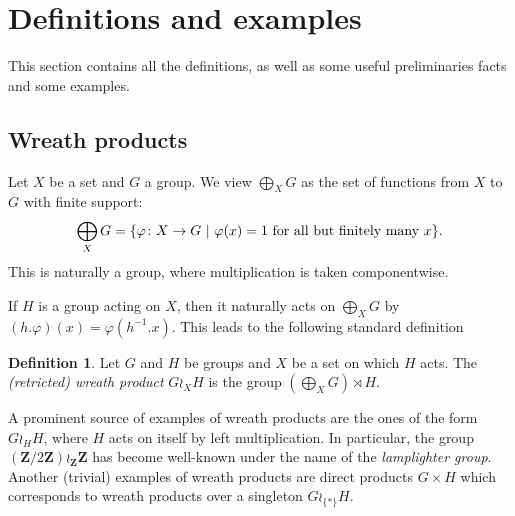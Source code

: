 \documentclass[a4paper]{article}
\newtheorem{cor}[lem]{Corollary}
\theoremstyle{definition}
\newtheorem{defn}[lem]{Definition}
\theoremstyle{remark}%
\newcommand*{\field}[1]{\mathbf{#1}}
\newcommand*{\Z}{\field{Z}}
\newcommand{\setst}[2]{\{#1\ |\ #2\}}
\begin{document}
%
%
%
%
%
%
%
%
%
%
\section{Definitions and examples}
This section contains all the definitions, as well as some useful preliminaries facts and some examples.
%
%
%
%
%
%
%
%
%
%
\subsection{Wreath products}
%
%
%
%
%
Let $X$ be a set and $G$ a group. We view
$\bigoplus_XG$ as the set of functions from $X$ to $G$ with finite support:
\[
	\bigoplus_XG=\setst{\varphi\colon X\to G}{\varphi(x)=1 \textnormal{ for all but finitely many }x}.
\]
This is naturally a group, where multiplication is taken componentwise.

If $H$ is a group acting on $X$, then it naturally acts on $\bigoplus_XG$
by $(h.\varphi)(x)=\varphi(h^{-1}.x)$.
This leads to the following standard definition
\begin{defn}\label{Def:WreathProd}
Let $G$ and $H$ be groups and $X$ be a set on which $H$ acts.
The \emph{(retricted) wreath product} $G\wr_XH$ is the group $(\bigoplus_XG)\rtimes H$.
\end{defn}
A prominent  source of examples of wreath products are the ones of the form $G\wr_HH$, where $H$ acts on itself by left multiplication.
In particular, the group $(\Z/2\Z)\wr_\Z\Z$ has become well-known under the name of the \emph{lamplighter group}.
Another (trivial) examples of wreath products are direct products $G\times H$ which corresponds to wreath products over a singleton $G\wr_{\{*\}}H$.
\end{document}
